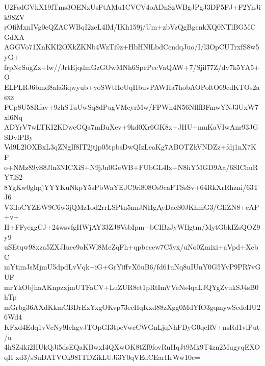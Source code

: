 U2FsdGVkX19fTms3OENxUsFtAMu1CVCV4oADnSzWBgJPgJ3DP5FJ+F2YnJik98ZV
rOfiMxnIVg0cQZACWBqI2zeL4lM/IKh159j/Um+zbVzQgBgcnkXQ0NTlBGMCGdXA
AGGVo71XnKKl2OXkZKNb4WzTi9z+HbHNlLbdCcndqJuo/I/l3OpCUTrxfS8w5yG+
frpNeSugZx+lw//JrtEjqdmGzGOwMNh6SpePccVaQAW+7/Sjil77Z/dv7k5YA5+O
ELPLRJ6bmd8ala3iqwyub+yoSWtHoUqHbuvPAWHa7hobAOPoltO69cdKTOs2asxz
FCp8U58Rfav+9zhSTuUwSq8dPugVMcyrMw/FPWh4N56NllfBFmwYNJ3UxW7xl6Nq
ADYrV7wLTKI2KDwcGQa7mBuXev+9kd0Xr6GK8x+JHU+muKaVIwAnr93JGSDvlPBy
Vd9L2lOXBxL3qZNgIf8IT2jtjp05tpbsDwQIzLeaKg7ABOTZkVNDZz+fdj1nX7KF
o+NMz89yS8Jln3NICXiS+N9jJn0GeWB+FUbGL4lx+N8hYMGD9Aa/6SIChuRY7lS2
8YgKw0ghpjYYYKuNkpY5sPbWaYEJC9ri808Os9caFTSsSv+64RkXrRhzni/63TJ6
V3iIoCYZEW9C6w3jQMz1od2rrLSPtn5nnJNHgAyDaeS0JKhmG3/GIiZN8+cAP+v+
H+FFyeggCJ+24wsvfgHWjAY33ZJ8VsbIpm+bCIBzJyWIlgtm/MytGbkIZsQOZ9y9
uSEtqw98xza5ZXJIuee9oKWl8MeZqFh+qpbecew7C5yx/uNo0Zmixi+aVpd+XcbC
mYtimJsMjmU5dpdLvVqk+iG+GrYiffvX6uB6/fd61uNq8uIUnY0G5YvP9PR7vGUF
mrYkObjhaAKnpzxjmUTFaCV+LuZUR8et1pRtImVVeNs4qaLJQYgZvukSJ4sB0hTp
mGrbg36AXdKkmCBDrExYxgOKvp73ecHqKxd88zXgg0MdYfO3gqmywSedeHU26Wd4
KFxd4Edq1vVcNy9IehgvJTOpGI3tpeVwcCWGnLjqNhFDyG0qeRV+nsRd1vlPut/u
4hSZ4ki2HUkQJi5dsEQaKBwxI4QXwOK8tZf9fovRuHqJt9Mk9T4zn2MugyqEXOqH
xd3/sSuDATVOk981TDZikLUJi3Y0qVEdCEarHrWw10c=
